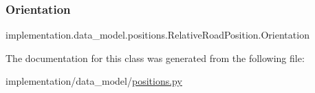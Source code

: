 \subsubsection{\texorpdfstring{Orientation}{Orientation}}
{\footnotesize\ttfamily implementation.\+data\+\_\+model.\+positions.\+Relative\+Road\+Position.\+Orientation\hspace{0.3cm}{\ttfamily [static]}}



The documentation for this class was generated from the following file\+:\begin{DoxyCompactItemize}
\item 
implementation/data\+\_\+model/\hyperlink{positions_8py}{positions.\+py}\end{DoxyCompactItemize}
